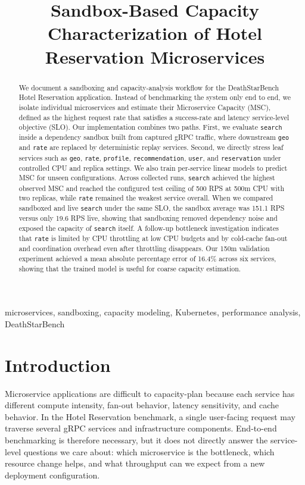 \documentclass[conference]{IEEEtran}
\title{Sandbox-Based Capacity Characterization of Hotel Reservation Microservices}
\author{
\IEEEauthorblockN{Sathish and Team}
\IEEEauthorblockA{Semester 6 SSP Project\\
DeathStarBench Hotel Reservation Sandboxing Study}
}
\begin{document}
\maketitle

\begin{abstract}
We document a sandboxing and capacity-analysis workflow for the DeathStarBench Hotel Reservation application. Instead of benchmarking the system only end to end, we isolate individual microservices and estimate their Microservice Capacity (MSC), defined as the highest request rate that satisfies a success-rate and latency service-level objective (SLO). Our implementation combines two paths. First, we evaluate \texttt{search} inside a dependency sandbox built from captured gRPC traffic, where downstream \texttt{geo} and \texttt{rate} are replaced by deterministic replay services. Second, we directly stress leaf services such as \texttt{geo}, \texttt{rate}, \texttt{profile}, \texttt{recommendation}, \texttt{user}, and \texttt{reservation} under controlled CPU and replica settings. We also train per-service linear models to predict MSC for unseen configurations. Across collected runs, \texttt{search} achieved the highest observed MSC and reached the configured test ceiling of 500 RPS at 500m CPU with two replicas, while \texttt{rate} remained the weakest service overall. When we compared sandboxed and live \texttt{search} under the same SLO, the sandbox average was 151.1 RPS versus only 19.6 RPS live, showing that sandboxing removed dependency noise and exposed the capacity of \texttt{search} itself. A follow-up bottleneck investigation indicates that \texttt{rate} is limited by CPU throttling at low CPU budgets and by cold-cache fan-out and coordination overhead even after throttling disappears. Our 150m validation experiment achieved a mean absolute percentage error of 16.4\% across six services, showing that the trained model is useful for coarse capacity estimation.
\end{abstract}

\begin{IEEEkeywords}
microservices, sandboxing, capacity modeling, Kubernetes, performance analysis, DeathStarBench
\end{IEEEkeywords}

\section{Introduction}
Microservice applications are difficult to capacity-plan because each service has different compute intensity, fan-out behavior, latency sensitivity, and cache behavior. In the Hotel Reservation benchmark, a single user-facing request may traverse several gRPC services and infrastructure components. End-to-end benchmarking is therefore necessary, but it does not directly answer the service-level questions we care about: which microservice is the bottleneck, which resource change helps, and what throughput can we expect from a new deployment configuration.
\end{document}
